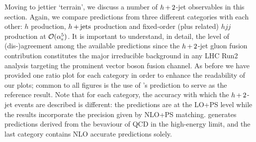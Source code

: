 

Moving to jettier `terrain', we discuss a number of $h\!\text{~+~}\!2$-jet
observables in this section. Again, we compare predictions from three
different categories with each other: \NNLOPS $h$ production,
\MEPSatNLO $h\!\text{~+~}\!\text{jets}$ production and fixed-order (plus related)
$hjj$ production at ${\cal O}(\alpha^5_\mathrm{s})$. It is important
to understand, in detail, the level of (dis-)agreement among the
available predictions since the $h\!\text{~+~}\!2$-jet gluon fusion contribution
constitutes the major irreducible background in any LHC Run2 analysis
targeting the prominent vector boson fusion channel. As before we have
provided one ratio plot for each category in order to enhance the
readability of our plots; common to all figures is the use of \Powheg's
\NNLOPS prediction to serve as the reference result. Note that for
each category, the accuracy with which the $h\!\text{~+~}\!2$-jet events are
described is different: the \NNLOPS predictions are at the LO+PS level
while the \MEPSatNLO results incorporate the precision given by NLO+PS
matching. \Hej generates predictions derived from the bevaviour of QCD
in the high-energy limit, and the last category contains NLO accurate
predictions solely.


